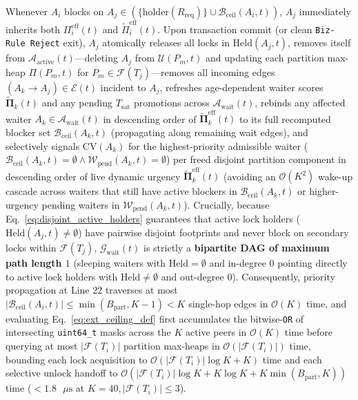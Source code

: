 \documentclass[conference,10pt]{IEEEtran}
\begin{document}
Whenever $A_i$ blocks on $A_j \in (\{\text{holder}(R_{\text{req}})\} \cup \mathcal{B}_{\text{ceil}}(A_i, t))$, $A_j$ immediately inherits both $\Pi_i^{\text{eff}}(t)$ and $\tilde{\Pi}_i^{\text{eff}}(t)$. Upon transaction commit (or clean \texttt{Biz-Rule Reject} exit), $A_j$ atomically releases all locks in $\text{Held}(A_j, t)$, removes itself from $\mathcal{A}_{\text{active}}(t)$---deleting $A_j$ from $\mathcal{U}(P_m, t)$ and updating each partition max-heap $\Pi(P_m, t)$ for $P_m \in \mathcal{F}(T_j)$---removes all incoming edges $(A_k \to A_j) \in \mathcal{E}(t)$ incident to $A_j$, refreshes age-dependent waiter scores $\tilde{\mathbf{\Pi}}_k(t)$ and any pending $T_{\text{sat}}$ promotions across $\mathcal{A}_{\text{wait}}(t)$, rebinds any affected waiter $A_k \in \mathcal{A}_{\text{wait}}(t)$ in descending order of $\tilde{\mathbf{\Pi}}_k^{\text{eff}}(t)$ to its full recomputed blocker set $\mathcal{B}_{\text{ceil}}(A_k, t)$ (propagating along remaining wait edges), and selectively signals $\text{CV}(A_k)$ for the highest-priority admissible waiter ($\mathcal{B}_{\text{ceil}}(A_k, t) = \emptyset \land \mathcal{W}_{\text{pend}}(A_k, t) = \emptyset$) per freed disjoint partition component in descending order of live dynamic urgency $\tilde{\mathbf{\Pi}}_k^{\text{eff}}(t)$ (avoiding an $\mathcal{O}(K^2)$ wake-up cascade across waiters that still have active blockers in $\mathcal{B}_{\text{ceil}}(A_k, t)$ or higher-urgency pending waiters in $\mathcal{W}_{\text{pend}}(A_k, t)$). Crucially, because Eq.~\eqref{eq:disjoint_active_holders} guarantees that active lock holders ($\text{Held}(A_j, t) \ne \emptyset$) have pairwise disjoint footprints and never block on secondary locks within $\mathcal{F}(T_j)$, $\mathcal{G}_{\text{wait}}(t)$ is strictly a \textbf{bipartite DAG of maximum path length $1$} (sleeping waiters with $\text{Held} = \emptyset$ and in-degree $0$ pointing directly to active lock holders with $\text{Held} \ne \emptyset$ and out-degree $0$). Consequently, priority propagation at Line 22 traverses at most $|\mathcal{B}_{\text{ceil}}(A_i, t)| \le \min(B_{\text{part}}, K - 1) < K$ single-hop edges in $\mathcal{O}(K)$ time, and evaluating Eq.~\eqref{eq:ext_ceiling_def} first accumulates the bitwise-\texttt{OR} of intersecting \texttt{uint64\_t} masks across the $K$ active peers in $\mathcal{O}(K)$ time before querying at most $|\mathcal{F}(T_i)|$ partition max-heaps in $\mathcal{O}(|\mathcal{F}(T_i)|)$ time, bounding each lock acquisition to $\mathcal{O}(|\mathcal{F}(T_i)|\log K + K)$ time and each selective unlock handoff to $\mathcal{O}(|\mathcal{F}(T_i)|\log K + K\log K + K\min(B_{\text{part}}, K))$ time ($< 1.8\text{ }\mu\text{s}$ at $K=40, |\mathcal{F}(T_i)| \le 3$).
\end{document}
